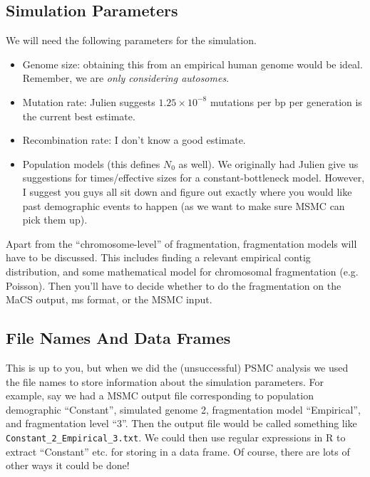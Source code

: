 \documentclass[11pt,a4paper]{article}
\begin{document}
\subsection{Simulation Parameters}
We will need the following parameters for the simulation.
\begin{itemize}
\item Genome size: obtaining this from an empirical human genome would be ideal. Remember, we are \emph{only considering autosomes}.
\item Mutation rate: Julien suggests $1.25\times 10^{-8}$ mutations per bp per generation is the current best estimate. 
\item Recombination rate: I don't know a good estimate.
\item Population models (this defines $N_0$ as well). We originally had Julien give us suggestions for times/effective sizes for a constant-bottleneck model. However, I suggest you guys all sit down and figure out exactly where you would like past demographic events to happen (as we want to make sure MSMC can pick them up).
\end{itemize}
Apart from the ``chromosome-level'' of fragmentation, fragmentation models will have to be discussed. This includes finding a relevant empirical contig distribution, and some mathematical model for chromosomal fragmentation (e.g. Poisson). Then you'll have to decide whether to do the fragmentation on the MaCS output, ms format, or the MSMC input.

\subsection{File Names And Data Frames}
This is up to you, but when we did the (unsuccessful) PSMC analysis we used the file names to store information about the simulation parameters. For example, say we had a MSMC output file corresponding to population demographic ``Constant'', simulated genome 2, fragmentation model ``Empirical'', and fragmentation level ``3''. Then the output file would be called something like \texttt{Constant\_2\_Empirical\_3.txt}. We could then use regular expressions in R to extract ``Constant'' etc. for storing in a data frame. Of course, there are lots of other ways it could be done!
\end{document}

